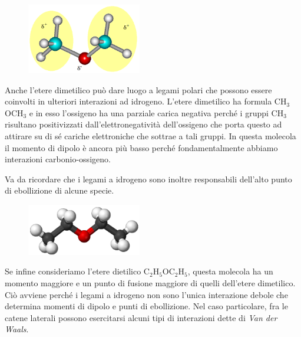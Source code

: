 \hspace{0.5cm}\begin{minipage}{0.35 \textwidth}
    \begin{figure}[H]
        \includegraphics[width=5cm]{immagini/etere_dimetilico.png}
    \end{figure}
\end{minipage}
\begin{minipage}{0.6 \textwidth}
    \vspace{0.6cm}Anche l'etere dimetilico può dare luogo a legami polari che possono essere coinvolti in ulteriori interazioni ad idrogeno. L'etere dimetilico ha formula CH$_3$OCH$_3$ e in esso l'ossigeno ha una parziale carica negativa perché i gruppi CH$_3$ risultano positivizzati dall'elettronegatività dell'ossigeno che porta questo ad attirare su di sé cariche elettroniche che sottrae a tali gruppi. In questa molecola il momento di dipolo è ancora più basso perché fondamentalmente abbiamo interazioni carbonio-ossigeno.
\end{minipage}

\vspace{0.2cm}Va da ricordare che i legami a idrogeno sono inoltre responsabili dell'alto punto di ebollizione di alcune specie.

\hspace{0.5cm}\begin{minipage}{0.35 \textwidth}
    \begin{figure}[H]
        \includegraphics[width=5cm]{immagini/etere_dietilico.png}
    \end{figure}
\end{minipage}
\begin{minipage}{0.6 \textwidth}
    \vspace{0.6cm}Se infine consideriamo l'etere dietilico C$_2$H$_5$OC$_2$H$_5$, questa molecola ha un momento maggiore e un punto di fusione maggiore di quelli dell'etere dimetilico. Ciò avviene perché i legami a idrogeno non sono l'unica interazione debole che determina momenti di dipolo e punti di ebollizione. Nel caso particolare, fra le catene laterali possono esercitarsi alcuni tipi di interazioni dette di \textit{Van der Waals}.
\end{minipage}


